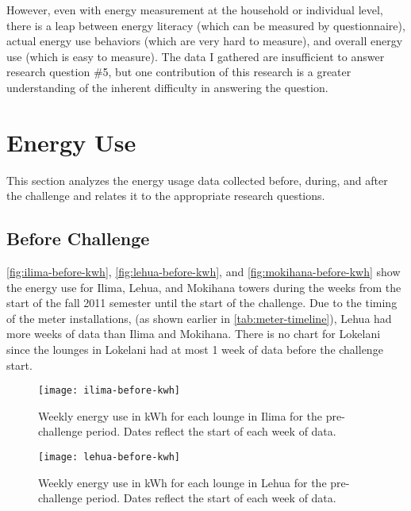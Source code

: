 However, even with energy measurement at the household or individual level, there is a leap between energy literacy (which can be measured by questionnaire), actual energy use behaviors (which are very hard to measure), and overall energy use (which is easy to measure). The data I gathered are insufficient to answer research question \#5, but one contribution of this research is a greater understanding of the inherent difficulty in answering the question.


\section{Energy Use}
\label{sec:energy-use}

This section analyzes the energy usage data collected before, during, and after the challenge and relates it to the appropriate research questions.


\subsection{Before Challenge}

\autoref{fig:ilima-before-kwh}, \autoref{fig:lehua-before-kwh}, and \autoref{fig:mokihana-before-kwh} show the energy use for Ilima, Lehua, and Mokihana towers during the weeks from the start of the fall 2011 semester until the start of the challenge. Due to the timing of the meter installations, (as shown earlier in \autoref{tab:meter-timeline}), Lehua had more weeks of data than Ilima and Mokihana. There is no chart for Lokelani since the lounges in Lokelani had at most 1 week of data before the challenge start.

\begin{figure}[htbp]
	\centering
	\texttt{[image: ilima-before-kwh]}
	\caption[Weekly pre-challenge energy use for each lounge in Ilima]{Weekly energy use in kWh for each lounge in Ilima for the pre-challenge period. Dates reflect the start of each week of data.}
	\label{fig:ilima-before-kwh}
\end{figure}

\begin{figure}[htbp]
	\centering
	\texttt{[image: lehua-before-kwh]}
	\caption[Weekly pre-challenge energy use for each lounge in Lehua]{Weekly energy use in kWh for each lounge in Lehua for the pre-challenge period. Dates reflect the start of each week of data.}
	\label{fig:lehua-before-kwh}
\end{figure}

